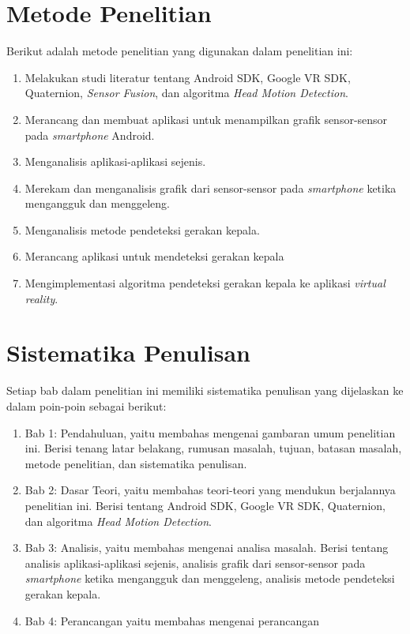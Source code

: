 \section{Metode Penelitian}

Berikut adalah metode penelitian yang digunakan dalam penelitian ini:
	\begin{enumerate}
		\item Melakukan studi literatur tentang Android SDK, Google VR SDK, Quaternion, \textit{Sensor Fusion}, dan algoritma \textit{Head Motion Detection}.
		\item Merancang dan membuat aplikasi untuk menampilkan grafik sensor-sensor pada \textit{smartphone} Android.
		\item Menganalisis aplikasi-aplikasi sejenis.
		\item Merekam dan menganalisis grafik dari sensor-sensor pada \textit{smartphone} ketika mengangguk dan menggeleng.
		\item Menganalisis metode pendeteksi gerakan kepala.
		\item Merancang aplikasi untuk mendeteksi gerakan kepala
		\item Mengimplementasi algoritma pendeteksi gerakan kepala ke aplikasi \textit{virtual reality}.
	\end{enumerate}
\section{Sistematika Penulisan}

Setiap bab dalam penelitian ini memiliki sistematika penulisan yang dijelaskan ke dalam poin-poin sebagai berikut:
\begin{enumerate}
	\item Bab 1: Pendahuluan, yaitu membahas mengenai gambaran umum penelitian ini. Berisi tenang latar belakang, rumusan masalah, tujuan, batasan masalah, metode penelitian, dan sistematika penulisan.
	\item Bab 2: Dasar Teori, yaitu membahas teori-teori yang mendukun berjalannya penelitian ini. Berisi tentang Android SDK, Google VR SDK, Quaternion, dan algoritma \textit{Head Motion Detection}.
	\item Bab 3: Analisis, yaitu membahas mengenai analisa masalah. Berisi tentang analisis aplikasi-aplikasi sejenis, analisis grafik dari sensor-sensor pada \textit{smartphone} ketika mengangguk dan menggeleng, analisis metode pendeteksi gerakan kepala. 
	\item Bab 4: Perancangan yaitu membahas mengenai perancangan
\end{enumerate}